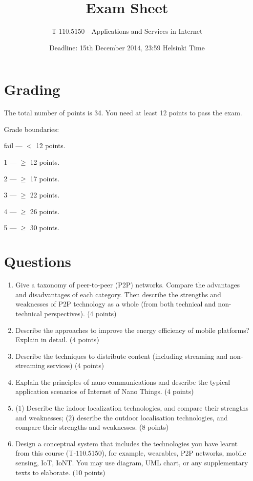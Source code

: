 \documentclass{article}
\title{\vspace{-10pt}Exam Sheet}
\author{T-110.5150 - Applications and Services in Internet}
\date{Deadline: 15th December 2014, 23:59 Helsinki Time}
\begin{document}
\maketitle

\section*{Grading}
\noindent
The total number of points is 34.
You need at least 12 points to pass the exam.

\noindent
Grade boundaries:
\vskip 10pt

fail --- $<$ 12 points.

1 --- $\ge$ 12 points.

2 --- $\ge$ 17 points.

3 --- $\ge$ 22 points.

4 --- $\ge$ 26 points.

5 --- $\ge$ 30 points.

\section*{Questions}

\begin{enumerate}

\item Give a taxonomy of peer-to-peer (P2P) networks. Compare the advantages and disadvantages of each category. Then describe the strengths and weaknesses of P2P technology as a whole (from both technical and non-technical perspectives). (4 points)

\item Describe the approaches to improve the energy efficiency of mobile platforms? Explain in detail. (4 points)

\item Describe the techniques to distribute content (including streaming and non-streaming services) (4 points)

\item Explain the principles of nano communications and describe the typical application scenarios of Internet of Nano Things. (4 points)

\item (1) Describe the indoor localization technologies, and compare their strengths and weaknesses; (2) describe the outdoor localisation technologies, and compare their strengths and weaknesses.  (8 points)

\item Design a conceptual system that includes the technologies you have learnt from this course (T-110.5150), for example, wearables, P2P networks, mobile sensing, IoT, IoNT. You may use diagram, UML chart, or any supplementary texts to elaborate. (10 points)



\end{enumerate}
\end{document}
